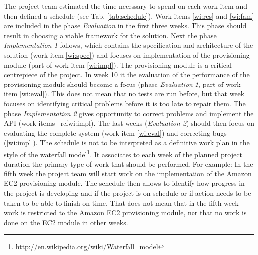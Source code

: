 \documentclass[12pt]{article}
\begin{document}
The project team estimated the time necessary to spend on each work item and then defined a schedule (see Tab. \ref{tab:schedule}). Work items \ref{wi:res} and \ref{wi:fam} are included in the phase \emph{Evaluation} in the first three weeks. This phase should result in choosing a viable framework for the solution. Next the phase \emph{Implementation 1} follows, which contains the specification and architecture of the solution (work item \ref{wi:spec}) and focuses on implementation of the provisioning module (part of work item \ref{wi:impl}). The provisioning module is a critical centrepiece of the project. In week 10 it the evaluation of the performance of the provisioning module should become a focus (phase \emph{Evaluation 1}, part of work item \ref{wi:eval}). This does not mean that no tests are run before, but that week focuses on identifying critical problems before it is too late to repair them. The phase \emph{Implementation 2} gives opportunity to correct problems and implement the API (work items \
ref{wi:impl}). The last weeks (\emph{Evaluation 2}) should then focus on evaluating the complete system (work item \ref{wi:eval}) and correcting bugs (\ref{wi:impl}). The schedule is not to be interpreted as a definitive work plan in the style of the waterfall model\footnote{http://en.wikipedia.org/wiki/Waterfall\_model}. It associates to each week of the planned project duration the primary type of work that should be performed. For example: In the fifth week the project team will start work on the implementation of the Amazon EC2 provisioning module. The schedule then allows to identify how progress in the project is developing and if the project is on schedule or if action needs to be taken to be able to finish on time. That does not mean that in the fifth week work is restricted to the Amazon EC2 provisioning module, nor that no work is done on the EC2 module in other weeks.
\end{document}
